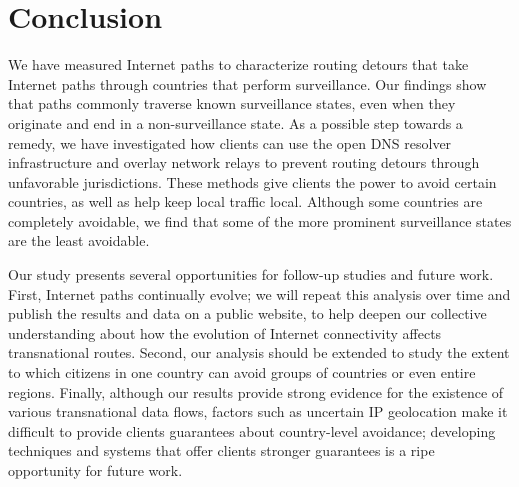\section{Conclusion}
\label{conclusion}

We have measured Internet paths to characterize routing
detours that take Internet paths through countries that perform
surveillance.  Our findings show that paths commonly traverse known
surveillance states, even when they originate and end in a
non-surveillance state.  As a possible step towards a remedy, we have
investigated how clients can use the open DNS resolver infrastructure
and overlay network relays to prevent routing detours through
unfavorable jurisdictions.  These methods give clients the power to
avoid certain countries, as well as help keep local traffic local.
Although some countries are completely avoidable, we find that some of
the more prominent surveillance states are the least avoidable.


Our study presents several opportunities for follow-up studies and
future work. First, Internet paths continually
evolve; we will repeat this analysis over time and publish the results
and data on a public website, to help deepen our collective
understanding about how the evolution of Internet connectivity affects
transnational routes. Second, our analysis should be extended to study
the extent to which citizens in one country can avoid groups of
countries or even entire regions. Finally, although our results provide strong 
evidence for the existence of various transnational data flows, factors
such as uncertain IP geolocation make it difficult to provide clients
guarantees about country-level avoidance; developing techniques and
systems that offer clients stronger guarantees
is a ripe opportunity for future work.

